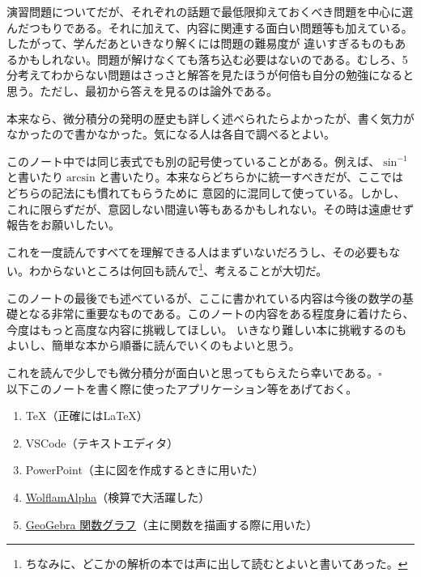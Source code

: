 \documentclass[a4j,dvipdfmx]{jsarticle}
\begin{document}
        演習問題についてだが、それぞれの話題で最低限抑えておくべき問題を中心に選んだつもりである。それに加えて、内容に関連する面白い問題等も加えている。したがって、学んだあといきなり解くには問題の難易度が
        違いすぎるものもあるかもしれない。問題が解けなくても落ち込む必要はないのである。むしろ、5分考えてわからない問題はさっさと解答を見たほうが何倍も自分の勉強になると思う。ただし、最初から答えを見るのは論外である。

        本来なら、微分積分の発明の歴史も詳しく述べられたらよかったが、書く気力がなかったので書かなかった。気になる人は各自で調べるとよい。

        このノート中では同じ表式でも別の記号使っていることがある。例えば、$\sin^{-1}$と書いたり$\arcsin$と書いたり。本来ならどちらかに統一すべきだが、ここではどちらの記法にも慣れてもらうために
        意図的に混同して使っている。しかし、これに限らずだが、意図しない間違い等もあるかもしれない。その時は遠慮せず報告をお願いしたい。

        これを一度読んですべてを理解できる人はまずいないだろうし、その必要もない。わからないところは何回も読んで\footnote{ちなみに、どこかの解析の本では声に出して読むとよいと書いてあった。}、考えることが大切だ。

        このノートの最後でも述べているが、ここに書かれている内容は今後の数学の基礎となる非常に重要なものである。このノートの内容をある程度身に着けたら、今度はもっと高度な内容に挑戦してほしい。
        いきなり難しい本に挑戦するのもよいし、簡単な本から順番に読んでいくのもよいと思う。
        
        これを読んで少しでも微分積分が面白いと思ってもらえたら幸いである。$\square$\\

        以下このノートを書く際に使ったアプリケーション等をあげておく。
        \begin{enumerate}
            \item \TeX （正確には\LaTeX）
            \item VSCode（テキストエディタ）
            \item PowerPoint（主に図を作成するときに用いた）
            \item \href{https://www.wolframalpha.com/}{WolflamAlpha}（検算で大活躍した）
            \item \href{https://www.geogebra.org/graphing}{GeoGebra 関数グラフ}（主に関数を描画する際に用いた）
        \end{enumerate}

        
\end{document}
